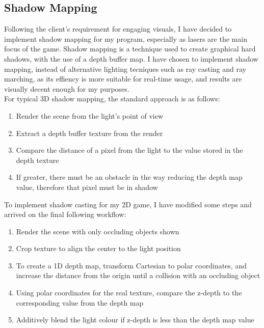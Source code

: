 \documentclass[../main/main.tex]{subfiles}
\begin{document}
\subsection{Shadow Mapping}
\label{sec:design-shadow}
Following the client's requirement for engaging visuals, I have decided to implement shadow mapping for my program, especially as lasers are the main focus of the game. Shadow mapping is a technique used to create graphical hard shadows, with the use of a depth buffer map. I have chosen to implement shadow mapping, instead of alternative lighting tecniques such as ray casting and ray marching, as its effiency is more suitable for real-time usage, and results are visually decent enough for my purposes.
\\
For typical 3D shadow mapping, the standard approach is as follows:

\begin{enumerate}
\item Render the scene from the light's point of view
\item Extract a depth buffer texture from the render
\item Compare the distance of a pixel from the light to the value stored in the depth texture
\item If greater, there must be an obstacle in the way reducing the depth map value, therefore that pixel must be in shadow
\end{enumerate} 

\noindent To implement shadow casting for my 2D game, I have modified some steps and arrived on the final following workflow:

\begin{enumerate}
\item Render the scene with only occluding objects shown
\item Crop texture to align the center to the light position
\item To create a 1D depth map, transform Cartesian to polar coordinates, and increase the distance from the origin until a collision with an occluding object
\item Using polar coordinates for the real texture, compare the z-depth to the corresponding value from the depth map
\item Additively blend the light colour if z-depth is less than the depth map value
\end{enumerate}
\end{document}
